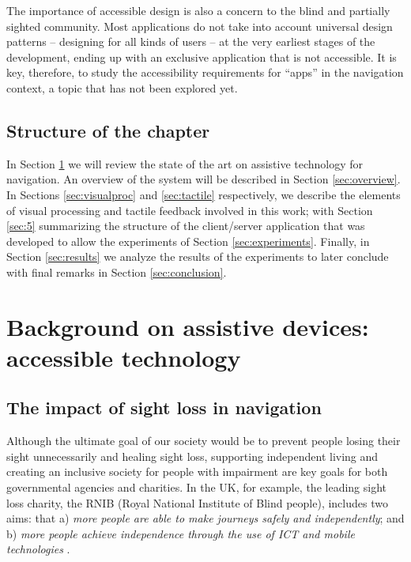 The importance of accessible design is also a concern to the blind and partially sighted community. Most applications do not take into account universal design patterns -- designing for all kinds of users -- at the very earliest stages of the development, ending up with an exclusive application that is not accessible\citep{AndroidHackathon}. It is key, therefore, to study the accessibility requirements for ``apps'' in the navigation context, a topic that has not been explored yet.


\subsection{Structure of the chapter}

In Section \ref{sec:2} we will review the state of the art on assistive technology for navigation. An overview of the system will be described in Section \ref{sec:overview}. In Sections \ref{sec:visualproc} and \ref{sec:tactile} respectively, we describe the elements of visual processing and tactile feedback involved in this work; with Section \ref{sec:5} summarizing the structure of the client/server application that was developed to allow the experiments of Section \ref{sec:experiments}. Finally, in Section \ref{sec:results} we analyze the results of the experiments to later conclude with final remarks in Section \ref{sec:conclusion}.

\section{Background on assistive devices: accessible technology}
\label{sec:2}

\subsection{The impact of sight loss in navigation}

Although the ultimate goal of our society would be to prevent people losing their sight unnecessarily and healing sight loss, supporting independent living and creating an inclusive society for people with impairment are key goals for both governmental agencies and charities. In the UK, for example, the leading sight loss charity, the RNIB (Royal National Institute of Blind people), includes two aims: that a) \textit{more people are able to make journeys safely and independently}; and b) \textit{more people achieve independence through the use of ICT and mobile technologies} \citep{RNIB2009}.

